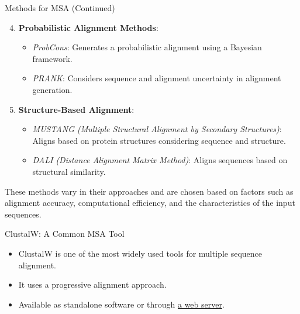 \documentclass[
  ignorenonframetext,
]{beamer}
\providecommand{\tightlist}{%
  \setlength{\itemsep}{0pt}\setlength{\parskip}{0pt}}
\begin{document}
\begin{frame}{Methods for MSA (Continued)}
\label{methods-for-msa-continued}
\begin{enumerate}
\setcounter{enumi}{3}
\tightlist
\item
  \textbf{Probabilistic Alignment Methods}:

  \begin{itemize}
  \tightlist
  \item
    \emph{ProbCons}: Generates a probabilistic alignment using a
    Bayesian framework.
  \item
    \emph{PRANK}: Considers sequence and alignment uncertainty in
    alignment generation.
  \end{itemize}
\item
  \textbf{Structure-Based Alignment}:

  \begin{itemize}
  \tightlist
  \item
    \emph{MUSTANG (Multiple Structural Alignment by Secondary
    Structures)}: Aligns based on protein structures considering
    sequence and structure.
  \item
    \emph{DALI (Distance Alignment Matrix Method)}: Aligns sequences
    based on structural similarity.
  \end{itemize}
\end{enumerate}

These methods vary in their approaches and are chosen based on factors
such as alignment accuracy, computational efficiency, and the
characteristics of the input sequences.
\end{frame}

\begin{frame}{ClustalW: A Common MSA Tool}
\label{clustalw-a-common-msa-tool}
\Large

\begin{itemize}
\tightlist
\item
  ClustalW is one of the most widely used tools for multiple sequence
  alignment.
\item
  It uses a progressive alignment approach.
\item
  Available as standalone software or through
  \href{https://www.genome.jp/tools-bin/clustalw}{a web server}.
\end{itemize}
\end{frame}
\end{document}
